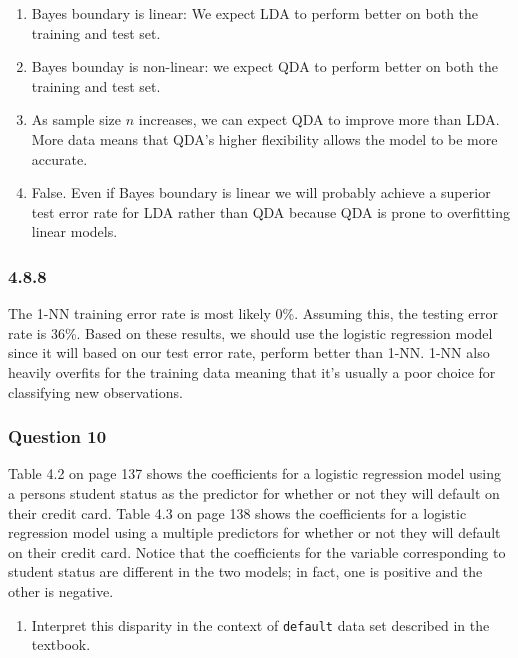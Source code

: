 \documentclass[
]{article}
\providecommand{\tightlist}{%
  \setlength{\itemsep}{0pt}\setlength{\parskip}{0pt}}
\begin{document}
\begin{enumerate}
\def\labelenumi{\alph{enumi}.}
\tightlist
\item
  Bayes boundary is linear: We expect LDA to perform better on both the
  training and test set.
\item
  Bayes bounday is non-linear: we expect QDA to perform better on both
  the training and test set.
\item
  As sample size \(n\) increases, we can expect QDA to improve more than
  LDA. More data means that QDA's higher flexibility allows the model to
  be more accurate.
\item
  False. Even if Bayes boundary is linear we will probably achieve a
  superior test error rate for LDA rather than QDA because QDA is prone
  to overfitting linear models.
\end{enumerate}

\subsubsection{4.8.8}\label{section-6}

The 1-NN training error rate is most likely 0\%. Assuming this, the
testing error rate is 36\%. Based on these results, we should use the
logistic regression model since it will based on our test error rate,
perform better than 1-NN. 1-NN also heavily overfits for the training
data meaning that it's usually a poor choice for classifying new
observations.

\subsubsection{Question 10}\label{question-10}

Table 4.2 on page 137 shows the coefficients for a logistic regression
model using a persons student status as the predictor for whether or not
they will default on their credit card. Table 4.3 on page 138 shows the
coefficients for a logistic regression model using a multiple predictors
for whether or not they will default on their credit card. Notice that
the coefficients for the variable corresponding to student status are
different in the two models; in fact, one is positive and the other is
negative.

\begin{enumerate}
\def\labelenumi{\alph{enumi}.}
\tightlist
\item
  Interpret this disparity in the context of \texttt{default} data set
  described in the textbook.
\end{enumerate}
\end{document}
